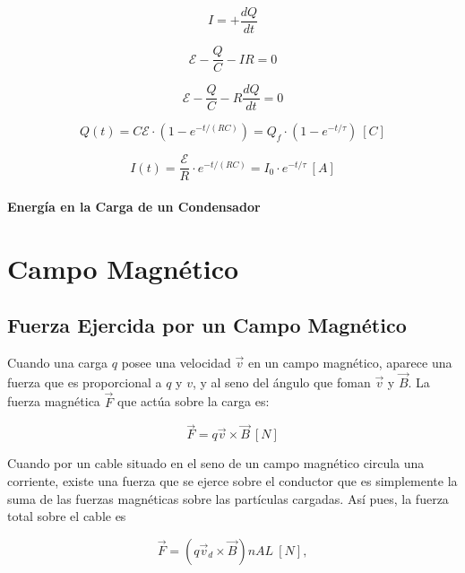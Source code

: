 \documentclass{tufte-handout}
\begin{document}
\begin{equation}
I = +\frac{dQ}{dt}
\end{equation}    

\begin{equation}
\mathcal{E}-\frac{Q}{C}-IR = 0
\end{equation}

\begin{equation}
\mathcal{E}-\frac{Q}{C}-R\frac{dQ}{dt} = 0
\end{equation}

\begin{equation}
Q(t) = C\mathcal{E} \cdot (1-e^{-t/(RC)}) = Q_f\cdot (1-e^{-t/\tau})~[C]
\end{equation}

\begin{equation}
I(t) = \frac{\mathcal{E}}{R}\cdot e^{-t/(RC)} = I_0\cdot e^{-t/\tau}~[A]
\end{equation}

\paragraph{Energía en la Carga de un Condensador}

\clearpage

\section{Campo Magnético}

\subsection{Fuerza Ejercida por un Campo Magnético}

Cuando una carga $q$ posee una velocidad $\vec{v}$ en un campo magnético, aparece una fuerza que es proporcional a $q$ y $v$, y al seno del ángulo que foman $\vec{v}$ y $\vec{B}$. La fuerza magnética $\vec{F}$ que actúa sobre la carga es:

\begin{equation}
\vec{F} = q\vec{v}\times\vec{B}~[N]
\end{equation}

Cuando por un cable situado en el seno de un campo magnético circula una corriente, existe una fuerza que se ejerce sobre el conductor que es simplemente la suma de las fuerzas magnéticas sobre las partículas cargadas. Así pues, la fuerza total sobre el cable es

\begin{equation}
\vec{F} = (q\vec{v}_d\times\vec{B})nAL~[N],
\end{equation}
\end{document}
